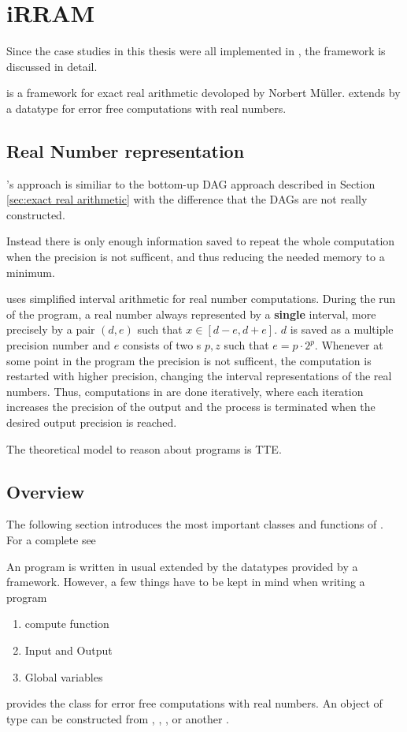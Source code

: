 \section{iRRAM}
	Since the case studies in this thesis were all implemented  in \irram, the \irram framework 
	is discussed in detail.

	\irram is a \cc framework for exact real arithmetic devoloped by Norbert M\"uller.
	\irram extends \cc by a datatype \real for error free computations with real numbers.
	\subsection{Real Number representation}
		\irram's approach is similiar to the bottom-up DAG approach described in Section \ref{sec:exact real arithmetic}
		with the difference that the DAGs are not really constructed.

		Instead there is only enough information saved to repeat the whole computation when the precision is not sufficent, and thus reducing the needed memory to a minimum.

		\irram uses simplified interval arithmetic for real number computations.
		During the run of the program, a real number always represented by a \textbf{single} interval, more precisely by a pair $(d,e)$ such that $x \in [d-e, d+e]$.
 		$d$ is saved as a multiple precision number and $e$ consists of two s $p,z$ such that $e = p \cdot 2^p$.
 		Whenever at some point in the program the precision is not sufficent, the computation is restarted with higher precision, 
 		changing the interval representations of the real numbers.
 		Thus, computations in \irram are done iteratively, where each iteration increases the precision of the output and the process is terminated when the desired output precision is reached. 

 		The theoretical model to reason about \irram programs is TTE.
	\subsection{Overview}
		The following section introduces the most important classes and functions of \irram. 
		For a complete see
		
		An \irram program is written in usual \cc extended by the datatypes provided by a framework.
		However, a few things have to be kept in mind when writing a program
		\begin{enumerate}
			\item compute function
			\item Input and Output
			\item Global variables
		\end{enumerate}
		\irram provides the class \real for error free computations with real numbers.
		An object of type \real can be constructed from , , ,  
		or another \real. 

